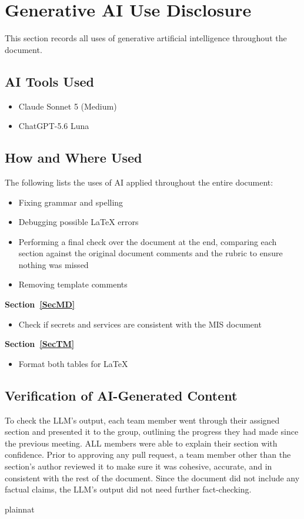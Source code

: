 \documentclass[12pt, titlepage]{article}
\begin{document}
\section{Generative AI Use Disclosure}
This section records all uses of generative artificial intelligence throughout the document.

\subsection{AI Tools Used}

\begin{itemize}
  \item Claude Sonnet 5 (Medium)
  \item ChatGPT-5.6 Luna
\end{itemize}

\subsection{How and Where Used}

The following lists the uses of AI applied throughout the entire document:
\begin{itemize}
  \item Fixing grammar and spelling
  \item Debugging possible \LaTeX{} errors
  \item Performing a final check over the document at the end, comparing each section against the original document comments and the rubric to ensure nothing was missed
  \item Removing template comments
\end{itemize}

\noindent\textbf{Section~\ref{SecMD}}
\begin{itemize}
    \item Check if secrets and services are consistent with the MIS document
\end{itemize}

\noindent\textbf{Section~\ref{SecTM}}
\begin{itemize}
    \item Format both tables for \LaTeX{}
\end{itemize}




\subsection{Verification of AI-Generated Content}

To check the LLM's output, each team member went through their assigned section and presented it to the group, outlining the progress they had made since the previous meeting.
ALL members were able to explain their section with confidence.
Prior to approving any pull request, a team member other than the section's author reviewed it to make sure it was cohesive, accurate, and in consistent with the rest of the document.
Since the document did not include any factual claims, the LLM's output did not need further fact-checking.

\newpage{}

 {plainnat}

\end{document}
